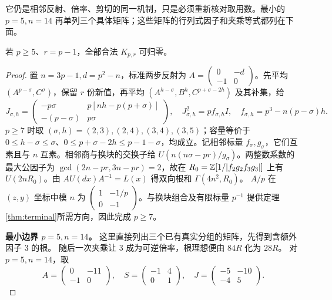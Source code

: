 它仍是相邻反射、倍率、剪切的同一机制，只是必须重新核对取用数。最小的 $p=5,n=14$ 再单列三个具体矩阵；这些矩阵的行列式因子和夹乘等式都列在下面。
\begin{lemma}\label{lem:upper-boundary}
若 $p\ge5$、$r=p-1$，全部合法 $K_{p,r}$ 可归零。
\end{lemma}
\begin{proof}
置 $n=3p-1,d=p^2-n$，标准两步反射为 $A=\left(\begin{smallmatrix}0&-d\\-1&0\end{smallmatrix}\right)$。先平均 $(A^{p-\sigma},C^\sigma)$，保留 $r$ 份新值，再平均 $(A^{h-\sigma},B^h,C^{p+\sigma-2h})$ 及其补集，给
\[
J_{\sigma,h}=\begin{pmatrix}-p\sigma&p[nh-p(p+\sigma)]\\-(p-\sigma)&p\sigma\end{pmatrix},
\quad J_{\sigma,h}^2=pf_{\sigma,h}I,\quad f_{\sigma,h}=p^3-n(p-\sigma)h.
\]
$p\ge7$ 时取 $(\sigma,h)=(2,3),(2,4),(3,4),(3,5)$；容量等价于 $0\le h-\sigma\le\sigma$、$0\le p+\sigma-2h\le p-1-\sigma$，均成立。记相邻标量 $f_\sigma,g_\sigma$，它们互素且与 $n$ 互素。相邻商与换块的交换子给 $U(n(n\sigma-pr)/g_\sigma)$。两整数系数的最大公因子为 $\gcd(2n-pr,3n-pr)=2$，故在 $R_0=\mathbb Z[1/|f_2g_2f_3g_3|]$ 上有 $U(2nR_0)$。由 $AU(dx)A^{-1}=L(x)$ 得双向根和 $\Gamma(4n^2,R_0)$。
$A/p$ 在 $(z,y)$ 坐标中模 $n$ 为 $\left(\begin{smallmatrix}1&-1/p\\0&-1\end{smallmatrix}\right)$。与换块组合及有限标量 $p^{-1}$ 提供定理\ref{thm:terminal}所需方向，因此完成 $p\ge7$。

\par\noindent\textbf{最小边界 $p=5,n=14$。}
这里直接列出三个已有真实分组的矩阵，先得到含额外因子 $3$ 的根。
随后一次夹乘让 $3$ 成为可逆倍率，根理想便由 $84R$ 化为 $28R$。
对 $p=5,n=14$，取
\[
A=\begin{pmatrix}0&-11\\-1&0\end{pmatrix},\quad
S=\begin{pmatrix}-1&4\\0&1\end{pmatrix},\quad
J=\begin{pmatrix}-5&-10\\-4&5\end{pmatrix}.
\]


\end{proof}
